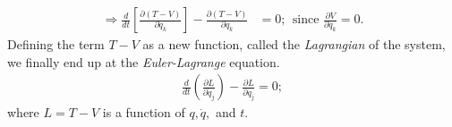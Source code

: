 \begin{enumerate}
\begin{align}
        \Rightarrow\frac{d}{dt}\left[\frac{\partial\left(T-V\right)}{\partial\dot{q}_k}\right]-\frac{\partial (T-V)}{\partial{q}_k}&=0;~~\text{since }\frac{\partial V}{\partial\dot{q}_k}=0.
    \end{align}
    Defining the term $T-V$ as a new function, called the \textit{Lagrangian} of the system, we finally end up at the \textit{Euler-Lagrange} equation.
    \begin{align}
        \frac{d}{dt} \left( \frac{\partial L}{\partial \dot{q}_j} \right) - \frac{\partial L}{\partial q_j} = 0;
    \end{align}
    where $L=T-V$ is a function of $q,\dot{q},$ and $t$.
\end{enumerate}